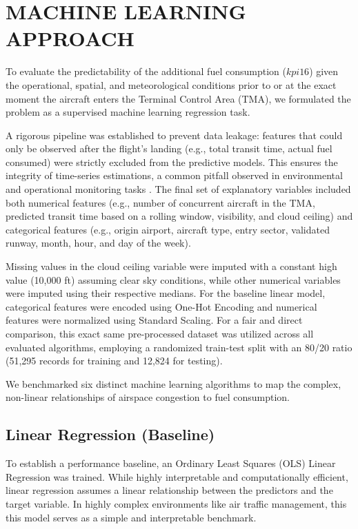 \section{MACHINE LEARNING APPROACH}
\label{sec:ml_task}

To evaluate the predictability of the additional fuel consumption ($kpi16$) given the operational, spatial, and meteorological conditions prior to or at the exact moment the aircraft enters the Terminal Control Area (TMA), we formulated the problem as a supervised machine learning regression task. 

A rigorous pipeline was established to prevent data leakage: features that could only be observed after the flight's landing (e.g., total transit time, actual fuel consumed) were strictly excluded from the predictive models. This ensures the integrity of time-series estimations, a common pitfall observed in environmental and operational monitoring tasks \cite{dataleakage}. The final set of explanatory variables included both numerical features (e.g., number of concurrent aircraft in the TMA, predicted transit time based on a rolling window, visibility, and cloud ceiling) and categorical features (e.g., origin airport, aircraft type, entry sector, validated runway, month, hour, and day of the week).

Missing values in the cloud ceiling variable were imputed with a constant high value (10,000 ft) assuming clear sky conditions, while other numerical variables were imputed using their respective medians. For the baseline linear model, categorical features were encoded using One-Hot Encoding and numerical features were normalized using Standard Scaling. For a fair and direct comparison, this exact same pre-processed dataset was utilized across all evaluated algorithms, employing a randomized train-test split with an 80/20 ratio (51,295 records for training and 12,824 for testing).

We benchmarked six distinct machine learning algorithms to map the complex, non-linear relationships of airspace congestion to fuel consumption.

\subsection{Linear Regression (Baseline)}
To establish a performance baseline, an Ordinary Least Squares (OLS) Linear Regression \cite{hastie2009elements} was trained. While highly interpretable and computationally efficient, linear regression assumes a linear relationship between the predictors and the target variable. In highly complex environments like air traffic management, this this model serves as a simple and interpretable benchmark.

